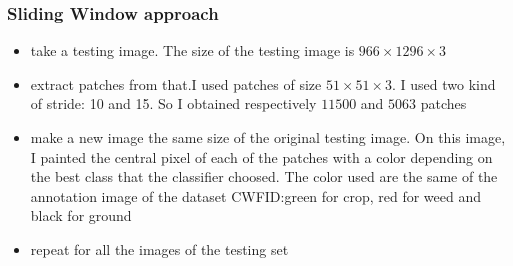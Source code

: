 \documentclass{beamer}
\begin{document}
\begin{frame}
\frametitle{Sliding Window approach}

\begin{itemize}

	\item take a testing image. The size of the testing image is $ 966\times 1296\times 3$
	\item extract patches from that.I used patches of size $ 51\times 51 \times 3 $. 				  I used two kind of stride: 10 and 15. So I obtained respectively $ 11500 $ and $ 		 		  5063 $ patches
	\item make a new image the same size of the original testing image. On this image, I 					  painted the central pixel of each of the patches with a color depending on the best  		  class that the classifier choosed. The color used are the same of the annotation 		          image of the dataset CWFID:green for crop, red for weed and black for ground
	\item repeat for all the images of the testing set

\end{itemize}

\end{frame}
\end{document}
